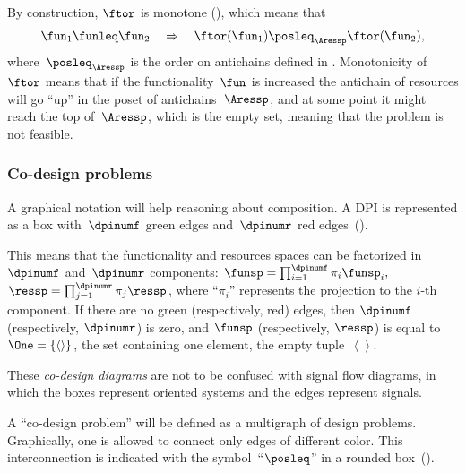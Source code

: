 By construction, $\ftor$ is monotone (), which
means that
\[
\fun_{1}\funleq\fun_{2}\quad\Rightarrow\quad\ftor(\fun_{1})\posleq_{\Aressp}\ftor(\fun_{2}),
\]
where~$\posleq_{\Aressp}$ is the order on antichains defined in
. Monotonicity of~$\ftor$ means that
if the functionality~$\fun$ is increased the antichain of resources
will go ``up'' in the poset of antichains~$\Aressp$, and at some
point it might reach the top of~$\Aressp$, which is the empty set,
meaning that the problem is not feasible.



\subsubsection{Co-design problems\label{sec:Co-design-problems}}

A graphical notation will help reasoning about composition. A DPI
is represented as a box with~$\dpinumf$ green edges and~$\dpinumr$
red edges~().


\noindent This means that the functionality and resources spaces
can be factorized in~$\dpinumf$ and~$\dpinumr$ components: $\funsp=\prod_{i=1}^{\dpinumf}\pi_{i}\funsp_{i},$
$\ressp=\prod_{j=1}^{\dpinumr}\pi_{j}\ressp$, where ``$\pi_{i}$''
represents the projection to the $i$-th component. If there are no
green (respectively, red) edges, then $\dpinumf$ (respectively, $\dpinumr$)
is zero, and $\funsp$ (respectively, $\ressp$) is equal to~$\One=\{\left\langle \right\rangle \}$,
the set containing one element, the empty tuple~$\left\langle \right\rangle $.

These \emph{co-design diagrams} are not to be confused with signal
flow diagrams, in which the boxes represent oriented systems and the
edges represent signals.

A ``co-design problem'' will be defined as a multigraph of design
problems. Graphically, one is allowed to connect only edges of different
color. This interconnection is indicated with the symbol~``$\posleq$''
in a rounded box~(). 

